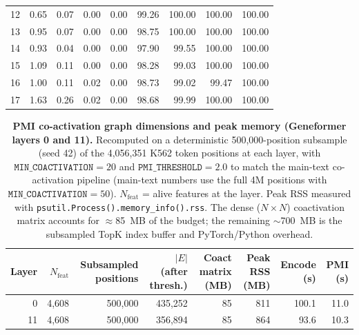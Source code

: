 \documentclass[onecolumn]{article}
\begin{document}
\begin{table}[H]
\begin{tabular}{r|rrrr|rrrr}
12 & 0.65 & 0.07 & 0.00 & 0.00 & 99.26 & 100.00 & 100.00 & 100.00 \\
13 & 0.95 & 0.07 & 0.00 & 0.00 & 98.75 & 100.00 & 100.00 & 100.00 \\
14 & 0.93 & 0.04 & 0.00 & 0.00 & 97.90 & 99.55 & 100.00 & 100.00 \\
15 & 1.09 & 0.11 & 0.00 & 0.00 & 98.28 & 99.03 & 100.00 & 100.00 \\
16 & 1.00 & 0.11 & 0.02 & 0.00 & 98.73 & 99.02 & 99.47 & 100.00 \\
17 & 1.63 & 0.26 & 0.02 & 0.00 & 98.68 & 99.99 & 100.00 & 100.00 \\
\bottomrule
\end{tabular}
\end{table}


\begin{table}[H]
\centering
\caption{\textbf{PMI co-activation graph dimensions and peak memory (Geneformer layers 0 and 11).} Recomputed on a deterministic 500{,}000-position subsample (seed 42) of the 4{,}056{,}351 K562 token positions at each layer, with $\texttt{MIN\_COACTIVATION}{=}20$ and $\texttt{PMI\_THRESHOLD}{=}2.0$ to match the main-text co-activation pipeline (main-text numbers use the full 4M positions with $\texttt{MIN\_COACTIVATION}{=}50$). $N_\text{feat}$ = alive features at the layer. Peak RSS measured with \texttt{psutil.Process().memory\_info().rss}. The dense ($N{\times}N$) coactivation matrix accounts for $\approx$85~MB of the budget; the remaining $\sim$700~MB is the subsampled TopK index buffer and PyTorch/Python overhead.}
\label{tab:pmi_memory}
\smallskip
\small
\begin{tabular}{rrrrrrrr}
\toprule
Layer & $N_\text{feat}$ & Subsampled positions & $|E|$ (after thresh.) & Coact matrix (MB) & Peak RSS (MB) & Encode (s) & PMI (s) \\
\midrule
0  & 4{,}608 & 500{,}000 & 435{,}252 & 85 & 811 & 100.1 & 11.0 \\
11 & 4{,}608 & 500{,}000 & 356{,}894 & 85 & 864 &  93.6 & 10.3 \\
\bottomrule
\end{tabular}
\end{table}
\end{document}
